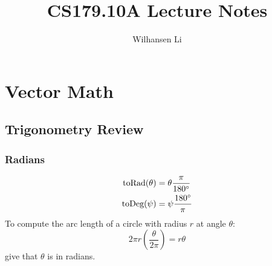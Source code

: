 \documentclass[12pt]{report}
\title{CS179.10A Lecture Notes}
\author{Wilhansen Li}
\begin{document}
	\maketitle
	\tableofcontents
	
	\chapter{Vector Math}
	\section{Trigonometry Review}
	\subsection{Radians}
	\begin{align*}
	\text{toRad}(\theta) &= \theta \frac{\pi}{180\degree} \\
	\text{toDeg}(\psi) &= \psi\frac{180\degree}{\pi}
	\end{align*}
	To compute the arc length of a circle with radius $r$ at angle $\theta$:
	$$
	2\pi r \left(\frac{\theta}{2\pi}\right) = r\theta
	$$
	give that $\theta$ is in radians.
\end{document}

